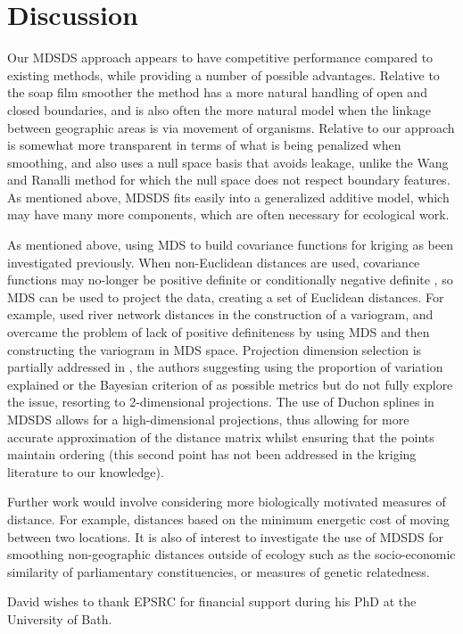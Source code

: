 \documentclass[smallextended]{svjour3}       %
\begin{document}
\section{Discussion}
\label{conclusion}

Our MDSDS approach appears to have competitive performance compared to existing methods, while providing a number of possible advantages. Relative to the soap film smoother the method has a more natural handling of open and closed boundaries, and is also often the more natural model when the linkage between geographic areas is via movement of organisms. Relative to \cite{Wang:2007tf} our approach is somewhat more transparent in terms of what is being penalized when smoothing, and also uses a null space basis that avoids leakage, unlike the Wang and Ranalli method for which the null space does not respect boundary features. As mentioned above, MDSDS fits easily into a generalized additive model, which may have many more components, which are often necessary for ecological work.

As mentioned above, using MDS to build covariance functions for kriging as been investigated previously. When non-Euclidean distances are used, covariance functions may no-longer be positive definite or conditionally negative definite \citep{Curriero:2005ww}, so MDS can be used to project the data, creating a set of Euclidean distances. For example, \cite{Loland:2003tp} used river network distances in the construction of a variogram, and overcame the problem of lack of positive definiteness by using MDS and then constructing the variogram in MDS space. Projection dimension selection is partially addressed in \cite{Jensen:2006kn}, the authors suggesting using the proportion of variation explained or the Bayesian criterion of \cite{Oh:2011ve} as possible metrics but do not fully explore the issue, resorting to 2-dimensional projections. The use of Duchon splines in MDSDS allows for a high-dimensional projections, thus allowing for more accurate approximation of the distance matrix whilst ensuring that the points maintain ordering (this second point has not been addressed in the kriging literature to our knowledge).

Further work would involve considering more biologically motivated measures of distance. For example, distances based on the minimum energetic cost of moving between  two locations. It is also of interest to investigate the use of MDSDS for smoothing non-geographic distances outside of ecology such as the socio-economic similarity of parliamentary constituencies, or measures of genetic relatedness.

\begin{acknowledgements}
David wishes to thank EPSRC for financial support during his PhD at the University of Bath.
\end{acknowledgements}

\end{document}
